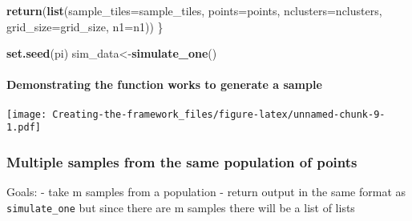 \documentclass[
]{article}
\newenvironment{Shaded}{\begin{snugshade}}{\end{snugshade}}
\newcommand{\AttributeTok}[1]{\textcolor[rgb]{0.13,0.29,0.53}{#1}}
\newcommand{\ConstantTok}[1]{\textcolor[rgb]{0.56,0.35,0.01}{#1}}
\newcommand{\DecValTok}[1]{\textcolor[rgb]{0.00,0.00,0.81}{#1}}
\newcommand{\FunctionTok}[1]{\textcolor[rgb]{0.13,0.29,0.53}{\textbf{#1}}}
\newcommand{\NormalTok}[1]{#1}
\newcommand{\OtherTok}[1]{\textcolor[rgb]{0.56,0.35,0.01}{#1}}
\newcommand{\SpecialCharTok}[1]{\textcolor[rgb]{0.81,0.36,0.00}{\textbf{#1}}}
\begin{document}
\begin{Shaded}
\begin{Highlighting}[]
  \FunctionTok{return}\NormalTok{(}\FunctionTok{list}\NormalTok{(}\AttributeTok{sample\_tiles=}\NormalTok{sample\_tiles,}
              \AttributeTok{points=}\NormalTok{points,}
              \AttributeTok{nclusters=}\NormalTok{nclusters,}
              \AttributeTok{grid\_size=}\NormalTok{grid\_size,}
              \AttributeTok{n1=}\NormalTok{n1))}
\NormalTok{\}}

\FunctionTok{set.seed}\NormalTok{(pi)}
\NormalTok{sim\_data}\OtherTok{\textless{}{-}}\FunctionTok{simulate\_one}\NormalTok{()}
\end{Highlighting}
\end{Shaded}

\paragraph{Demonstrating the function works to generate a
sample}\label{demonstrating-the-function-works-to-generate-a-sample}

\begin{Shaded}
\end{Shaded}

\texttt{[image: Creating-the-framework\_files/figure-latex/unnamed-chunk-9-1.pdf]}

\subsubsection{Multiple samples from the same population of
points}\label{multiple-samples-from-the-same-population-of-points}

Goals: - take m samples from a population - return output in the same
format as \texttt{simulate\_one} but since there are m samples there
will be a list of lists
\end{document}
